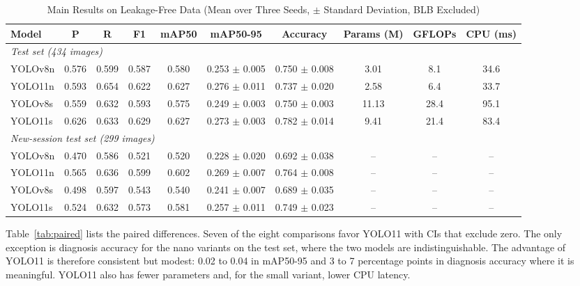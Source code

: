 \documentclass[conference,a4paper]{IEEEtran}
\begin{document}
\begin{table}[htbp]
\caption{Main Results on Leakage-Free Data (Mean over Three Seeds, $\pm$ Standard Deviation, BLB Excluded)}
\begin{center}
\setlength{\tabcolsep}{4pt}
\begin{tabular}{|l|c|c|c|c|c|c|c|c|c|}
\hline
\textbf{Model} & \textbf{P} & \textbf{R} & \textbf{F1} & \textbf{mAP50} & \textbf{mAP50-95} & \textbf{Accuracy} & \textbf{Params (M)} & \textbf{GFLOPs} & \textbf{CPU (ms)} \\
\hline
\multicolumn{10}{|l|}{\textit{Test set (434 images)}} \\
\hline
YOLOv8n & 0.576 & 0.599 & 0.587 & 0.580 & 0.253 $\pm$ 0.005 & 0.750 $\pm$ 0.008 & 3.01 & 8.1 & 34.6 \\
YOLO11n & 0.593 & 0.654 & 0.622 & 0.627 & 0.276 $\pm$ 0.011 & 0.737 $\pm$ 0.020 & 2.58 & 6.4 & 33.7 \\
YOLOv8s & 0.559 & 0.632 & 0.593 & 0.575 & 0.249 $\pm$ 0.003 & 0.750 $\pm$ 0.003 & 11.13 & 28.4 & 95.1 \\
YOLO11s & 0.626 & 0.633 & 0.629 & 0.627 & 0.273 $\pm$ 0.003 & 0.782 $\pm$ 0.014 & 9.41 & 21.4 & 83.4 \\
\hline
\multicolumn{10}{|l|}{\textit{New-session test set (299 images)}} \\
\hline
YOLOv8n & 0.470 & 0.586 & 0.521 & 0.520 & 0.228 $\pm$ 0.020 & 0.692 $\pm$ 0.038 & -- & -- & -- \\
YOLO11n & 0.565 & 0.636 & 0.599 & 0.602 & 0.269 $\pm$ 0.007 & 0.764 $\pm$ 0.008 & -- & -- & -- \\
YOLOv8s & 0.498 & 0.597 & 0.543 & 0.540 & 0.241 $\pm$ 0.007 & 0.689 $\pm$ 0.035 & -- & -- & -- \\
YOLO11s & 0.524 & 0.632 & 0.573 & 0.581 & 0.257 $\pm$ 0.011 & 0.749 $\pm$ 0.023 & -- & -- & -- \\
\hline
\end{tabular}
\par\vspace{2pt}{\scriptsize P, R, F1, and mAP refer to lesion detection; accuracy refers to image-level diagnosis. CPU latency at batch size 1, FP32, 640 pixels.}
\label{tab:main}
\end{center}
\end{table}

Table~\ref{tab:paired} lists the paired differences. Seven of the eight comparisons favor YOLO11 with CIs that exclude zero. The only exception is diagnosis accuracy for the nano variants on the test set, where the two models are indistinguishable. The advantage of YOLO11 is therefore consistent but modest: 0.02 to 0.04 in mAP50-95 and 3 to 7 percentage points in diagnosis accuracy where it is meaningful. YOLO11 also has fewer parameters and, for the small variant, lower CPU latency.
\end{document}
